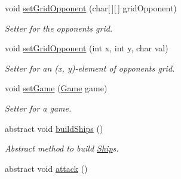 \begin{DoxyCompactItemize}
void \hyperlink{classPlayer_a3b65aecb541790ce379f68828a24517a}{set\+Grid\+Opponent} (char\mbox{[}$\,$\mbox{]}\mbox{[}$\,$\mbox{]} grid\+Opponent)
\begin{DoxyCompactList}\small\item\em Setter for the opponent\textquotesingle{}s grid. \end{DoxyCompactList}\item 
void \hyperlink{classPlayer_a9555543f75989387be2e65769fbba816}{set\+Grid\+Opponent} (int x, int y, char val)
\begin{DoxyCompactList}\small\item\em Setter for an (x, y)-\/element of opponent\textquotesingle{}s grid. \end{DoxyCompactList}\item 
void \hyperlink{classPlayer_a75ac90ea1583ab7f6b09c48f7f414f44}{set\+Game} (\hyperlink{classGame}{Game} game)
\begin{DoxyCompactList}\small\item\em Setter for a game. \end{DoxyCompactList}\item 
abstract void \hyperlink{classPlayer_ac9db31c39141ff98362287a8bb998ef4}{build\+Ships} ()\hypertarget{classPlayer_ac9db31c39141ff98362287a8bb998ef4}{}\label{classPlayer_ac9db31c39141ff98362287a8bb998ef4}

\begin{DoxyCompactList}\small\item\em Abstract method to build \hyperlink{classShip}{Ship}\textquotesingle{}s. \end{DoxyCompactList}\item 
abstract void \hyperlink{classPlayer_abd852c2c1a9728644a45dd53a84871de}{attack} ()\hypertarget{classPlayer_abd852c2c1a9728644a45dd53a84871de}{}\label{classPlayer_abd852c2c1a9728644a45dd53a84871de}


\end{DoxyCompactItemize}
